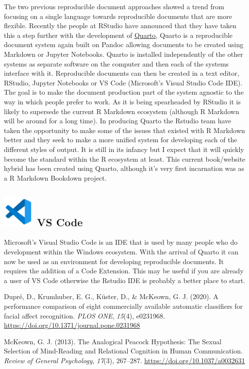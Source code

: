 \documentclass[
  letterpaper,
  DIV=11,
  numbers=noendperiod]{scrreprt}
\newlength{\cslhangindent}
\newenvironment{CSLReferences}[2] %
 {\begin{list}{}{%
  \setlength{\itemindent}{0pt}
  \setlength{\leftmargin}{0pt}
  \setlength{\parsep}{0pt}
  \ifodd #1
   \setlength{\leftmargin}{\cslhangindent}
   \setlength{\itemindent}{-1\cslhangindent}
  \fi
  \setlength{\itemsep}{#2\baselineskip}}}
 {\end{list}}
\begin{document}
The two previous reproducible document approaches showed a trend from
focusing on a single language towards reproducible documents that are
more flexible. Recently the people at RStudio have announced that they
have taken this a step further with the development of
\href{https://quarto.org}{Quarto}, Quarto is a reproducible document
system again built on Pandoc allowing documents to be created using
Markdown or Jupyter Notebooks. Quarto is installed independently of the
other systems as separate software on the computer and then each of the
systems interface with it. Reproducible documents can then be created in
a text editor, RStudio, Jupyter Notebooks or VS Code (Microsoft's Visual
Studio Code IDE). The goal is to make the document production part of
the system agnostic to the way in which people prefer to work. As it is
being spearheaded by RStudio it is likely to supersede the current R
Markdown ecosystem (although R Markdown will be around for a long time).
In producing Quarto the Rstudio team have taken the opportunity to make
some of the issues that existed with R Markdown better and they seek to
make a more unified system for developing each of the different styles
of output. It is still in its infancy but I expect that it will quickly
become the standard within the R ecosystem at least. This current
book/website hybrid has been created using Quarto, although it's very
first incarnation was as a R Markdown Bookdown project.

\subsection[ VS
Code]{\texorpdfstring{\protect\includegraphics[width=0.625in,height=\textheight]{images/vscode_icon.png}
VS Code}{ VS Code}}\label{vs-code}

Microsoft's Visual Studio Code is an IDE that is used by many people who
do development within the Windows ecosystem. With the arrival of Quarto
it can now be used as an environment for developing reproducible
documents. It requires the addition of a Code Extension. This may be
useful if you are already a user of VS Code otherwise the Rstudio IDE is
probably a better place to start.

\label{refs}
\begin{CSLReferences}{1}{0}
Dupré, D., Krumhuber, E. G., Küster, D., \& McKeown, G. J. (2020). A
performance comparison of eight commercially available automatic
classifiers for facial affect recognition. \emph{PLOS ONE},
\emph{15}(4), e0231968.
\url{https://doi.org/10.1371/journal.pone.0231968}

McKeown, G. J. (2013). The Analogical Peacock Hypothesis: The Sexual
Selection of Mind-Reading and Relational Cognition in Human
Communication. \emph{Review of General Psychology}, \emph{17}(3),
267--287. \url{https://doi.org/10.1037/a0032631}

\end{CSLReferences}
\end{document}
